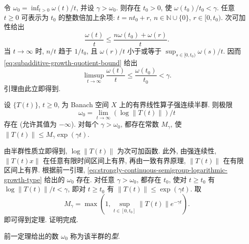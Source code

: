 \begin{Proof}
令 $\omega_0=\inf_{t>0}\omega(t)/t$, 并设 $\gamma>\omega_0$. 则存在 $t_0>0$, 使 $\omega(t_0)/t_0<\gamma$. 任意 $t\geq0$ 可表示为 $t_0$ 的整数倍加上余项: $t=nt_0+r$, $n\in\mathbb{N}\cup\{0\}$, $r\in[0,t_0)$. 次可加性给出
\begin{equation}\label{eq:subadditive-growth-quotient-bound}
\dfrac{\omega(t)}{t}\leq\dfrac{n\omega(t_0)+\omega(r)}{t}.
\end{equation}
当 $t\to\infty$ 时, $n/t$ 趋于 $1/t_0$, 且 $\omega(r)/t$ 小于或等于 $\sup_{s\in[0,t_0)}\omega(s)/t$. 因而 \eqref{eq:subadditive-growth-quotient-bound} 给出
\begin{equation}\label{eq:subadditive-growth-limsup-bound}
\limsup_{t\to\infty}\dfrac{\omega(t)}{t}\leq\dfrac{\omega(t_0)}{t_0}<\gamma.
\end{equation}
引理由此立即得到.
\end{Proof}

\begin{Theorem}
\label{thm:semigroup-logarithmic-growth-type}
设 $\{T(t)\}$, $t\geq0$, 为 Banach 空间 $X$ 上的有界线性算子强连续半群. 则极限
\begin{equation}\label{eq:strongly-continuous-semigroup-logarithmic-growth-type}
\omega_0=\lim_{t\to\infty}(\log\|T(t)\|)/t
\end{equation}
存在 (允许其值为 $-\infty$). 对每个 $\gamma>\omega_0$, 都存在常数 $M_\gamma$, 使 $\|T(t)\|\leq M_\gamma\exp(\gamma t)$.
\end{Theorem}

\begin{Proof}
由半群性质立即得到, $\log\|T(t)\|$ 为次可加函数. 此外, 由强连续性, $\|T(t)x\|$ 在任意有限时间区间上有界, 再由一致有界原理, $\|T(t)\|$ 在有限区间上有界. 根据前一引理, \eqref{eq:strongly-continuous-semigroup-logarithmic-growth-type} 给出的 $\omega_0$ 存在. 对任意 $\gamma>\omega_0$, 都存在 $t_0$, 使对 $t\geq t_0$ 有 $\log\|T(t)\|/t<\gamma$, 即对 $t\geq t_0$ 有 $\|T(t)\|\leq\exp(\gamma t)$. 取
\begin{equation}\label{eq:semigroup-exponential-growth-bound-constant}
M_\gamma=\max\left(1,\sup_{t\in[0,t_0]}\|T(t)\|e^{-\gamma t}\right).
\end{equation}
即可得到定理. 证明完成.
\end{Proof}

\begin{Definition}
\label{def:semigroup-type}
前一定理给出的数 $\omega_0$ 称为该半群的\emph{型}.
\end{Definition}

